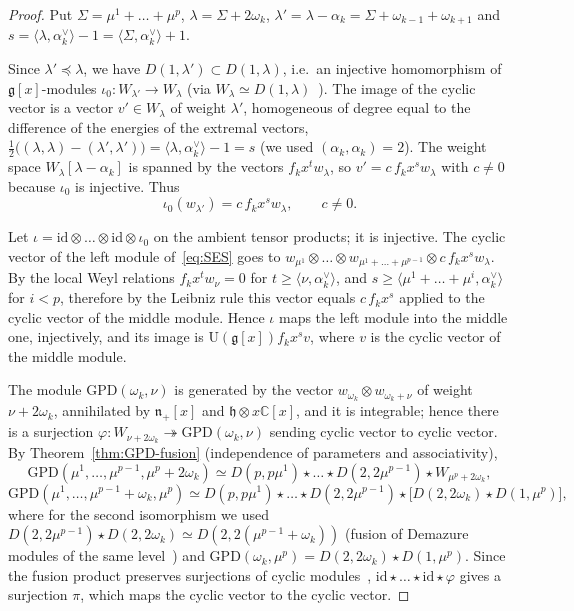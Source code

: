 \documentclass[11pt]{amsart}
\numberwithin{equation}{section}
\theoremstyle{definition}
\newcommand{\fg}{\mathfrak{g}}
\newcommand{\fh}{\mathfrak{h}}
\newcommand{\fn}{\mathfrak{n}}
\newcommand{\U}{\mathrm{U}}
\newcommand{\GPD}{\mathrm{GPD}}         %
\newcommand{\id}{\mathrm{id}}
\begin{document}
	\begin{proof}
		Put $\Sigma=\mu^1+\dots+\mu^p$, $\lambda=\Sigma+2\omega_k$, $\lambda'=\lambda-\alpha_k=\Sigma+\omega_{k-1}+\omega_{k+1}$ and $s=\langle\lambda,\alpha_k^\vee\rangle-1=\langle\Sigma,\alpha_k^\vee\rangle+1$.
		
		Since $\lambda'\preceq\lambda$, we have $D(1,\lambda')\subset D(1,\lambda)$, i.e.\ an injective homomorphism of $\fg[x]$-modules $\iota_0\colon W_{\lambda'}\to W_\lambda$ (via $W_\lambda\simeq D(1,\lambda)$~\cite{FL2}). The image of the cyclic vector is a vector $v'\in W_\lambda$ of weight $\lambda'$, homogeneous of degree equal to the difference of the energies of the extremal vectors, $\tfrac12\big((\lambda,\lambda)-(\lambda',\lambda')\big)=\langle\lambda,\alpha_k^\vee\rangle-1=s$ (we used $(\alpha_k,\alpha_k)=2$). The weight space $W_\lambda[\lambda-\alpha_k]$ is spanned by the vectors $f_kx^tw_\lambda$, so $v'=c\,f_kx^sw_\lambda$ with $c\ne0$ because $\iota_0$ is injective. Thus
		\[
		\iota_0(w_{\lambda'})=c\,f_kx^{s}w_\lambda,\qquad c\neq0.
		\]
		
		Let $\iota=\id\otimes\dots\otimes\id\otimes\iota_0$ on the ambient tensor products; it is injective. The cyclic vector of the left module of~\eqref{eq:SES} goes to $w_{\mu^1}\otimes\dots\otimes w_{\mu^1+\dots+\mu^{p-1}}\otimes c\,f_kx^sw_\lambda$. By the local Weyl relations $f_kx^tw_\nu=0$ for $t\ge\langle\nu,\alpha_k^\vee\rangle$, and $s\ge\langle\mu^1+\dots+\mu^i,\alpha_k^\vee\rangle$ for $i<p$, therefore by the Leibniz rule this vector equals $c\,f_kx^s$ applied to the cyclic vector of the middle module. Hence $\iota$ maps the left module into the middle one, injectively, and its image is $\U(\fg[x])f_kx^sv$, where $v$ is the cyclic vector of the middle module.
		
		The module $\GPD(\omega_k,\nu)$ is generated by the vector $w_{\omega_k}\otimes w_{\omega_k+\nu}$ of weight $\nu+2\omega_k$, annihilated by $\fn_+[x]$ and $\fh\otimes x\mathbb{C}[x]$, and it is integrable; hence there is a surjection $\varphi\colon W_{\nu+2\omega_k}\twoheadrightarrow\GPD(\omega_k,\nu)$ sending cyclic vector to cyclic vector. By Theorem~\ref{thm:GPD-fusion} (independence of parameters and associativity),
		\[
		\GPD(\mu^1,\dots,\mu^{p-1},\mu^p+2\omega_k)\simeq D(p,p\mu^1)\star\dots\star D(2,2\mu^{p-1})\star W_{\mu^p+2\omega_k},
		\]
		\[
		\GPD(\mu^1,\dots,\mu^{p-1}+\omega_k,\mu^p)\simeq D(p,p\mu^1)\star\dots\star D(2,2\mu^{p-1})\star\big[D(2,2\omega_k)\star D(1,\mu^p)\big],
		\]
		where for the second isomorphism we used $D(2,2\mu^{p-1})\star D(2,2\omega_k)\simeq D(2,2(\mu^{p-1}+\omega_k))$ (fusion of Demazure modules of the same level~\cite{FL1}) and $\GPD(\omega_k,\mu^p)=D(2,2\omega_k)\star D(1,\mu^p)$. Since the fusion product preserves surjections of cyclic modules~\cite[Proposition ``Fusion product preserves surjections'']{KM}, $\id\star\dots\star\id\star\varphi$ gives a surjection $\pi$, which maps the cyclic vector to the cyclic vector.
		

\end{proof}
\end{document}
